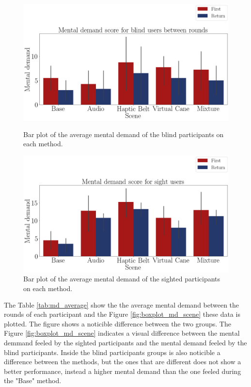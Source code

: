 \begin{figure}[!htb]
    \centering
    \begin{minipage}{\textwidth}
        \centering
        \includegraphics[width = 0.8\linewidth]{Resultados/Nasa/Figuras/png/barplot_md_avg_scene_blind.png}
        \caption{Bar plot of the average mental demand of the blind participants on each method.}
        \label{fig:barplot_md_scene_blind}
    \end{minipage}
    \begin{minipage}{\textwidth}
        \centering
        \includegraphics[width = 0.8\linewidth]{Resultados/Nasa/Figuras/png/barplot_md_avg_scene_sight.png}
        \caption{Bar plot of the average mental demand of the sighted participants on each method.}
        \label{fig:barplot_md_scene_sight}
    \end{minipage}
\end{figure}


The Table \ref{tab:md_average} show the the average mental demand between the rounds of each participant and the Figure \ref{fig:boxplot_md_scene} these data is plotted. The figure shows a noticible difference between the two groups.  The Figure \ref{fig:boxplot_md_scene} indicates a visual difference between the mental demmand feeled by the sighted participants and the mental demand feeled by the blind participants. Inside the blind participants groups is also noticible a difference between the methods, but the ones that are different does not show a better performance, instead a higher mental demand than the one feeled during the "Base" method.

